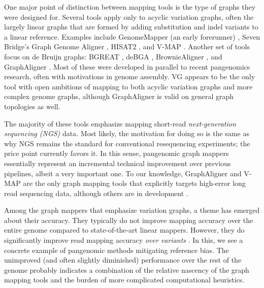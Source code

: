 One major point of distinction between mapping tools is the type of graphs they were designed for. 
Several tools apply only to acyclic variation graphs, often the largely linear graphs that are formed by adding substitution and indel variants to a linear reference. Examples include GenomeMapper (an early forerunner) \cite{Schneeberger_2009}, Seven Bridge's Graph Genome Aligner \cite{Rakocevic_2019}, HISAT2 \cite{Kim_2019}, and V-MAP \cite{Vaddadi_2019}. 
Another set of tools focus on de Bruijn graphs: BGREAT \cite{Limasset_2016}, deBGA \cite{Liu_2016}, BrownieAligner \cite{Heydari_2018}, and GraphAligner \cite{Rautiainen_2019b}. 
Most of these were developed in parallel to recent pangenomics research, often with motivations in genome assembly. 
VG \cite{Garrison_2019} appears to be the only tool with open ambitions of mapping to both acyclic variation graphs and more complex genome graphs, although GraphAligner is valid on general graph topologies as well.

The majority of these tools emphasize mapping short-read \emph{next-generation sequencing (NGS)} data. 
Most likely, the motivation for doing so is the same as why NGS remains the standard for conventional resequencing experiments; the price point currently favors it. 
In this sense, pangenomic graph mappers essentially represent an incremental technical improvement over previous pipelines, albeit a very important one. 
To our knowledge, GraphAligner and V-MAP are the only graph mapping tools that explicitly targets high-error long read sequencing data\cite{Rautiainen_2019b, Vaddadi_2019}, although others are in development \cite{Li_2019}.


Among the graph mappers that emphasize variation graphs, a theme has emerged about their accuracy. 
They typically do not improve mapping accuracy over the entire genome compared to state-of-the-art linear mappers. 
However, they do significantly improve read mapping accuracy \emph{over variants} \cite{Garrison_2019, Rakocevic_2019, Kim_2019}. 
In this, we see a concrete example of pangenomic methods mitigating reference bias. 
The unimproved (and often slightly diminished) performance over the rest of the genome probably indicates a combination of the relative nascency of the graph mapping tools and the burden of more complicated computational heuristics.

